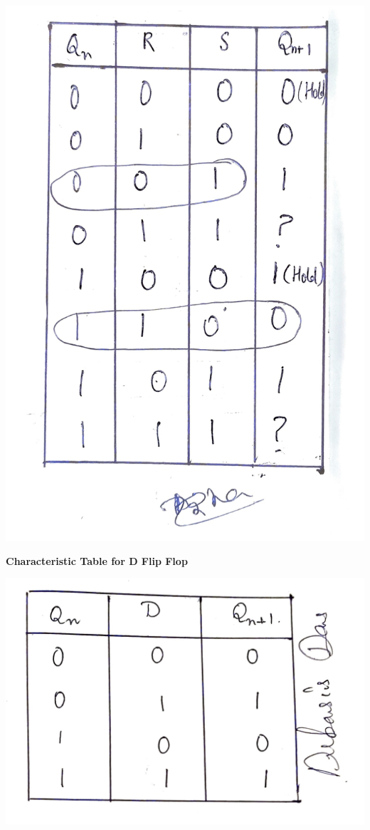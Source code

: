 \begin{center}
    \includegraphics[scale = 0.15]{Documents/tabrsclocked_1.jpg}
\end{center}
\begin{center}
    \textbf{Characteristic Table for D Flip Flop}
\end{center}
\begin{center}
    \includegraphics[scale = 0.1]{Documents/tabd_1.jpg}
\end{center}
